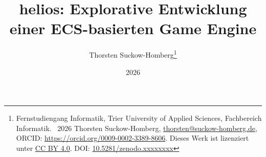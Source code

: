 \documentclass[a4paper,abstract=true]{scrreprt}
\theoremstyle{definition}
\begin{document}
    \title{helios: Explorative Entwicklung einer ECS-basierten Game Engine}

    \author{
        Thorsten Suckow-Homberg\thanks{%
          Fernstudiengang Informatik,
            Trier University of Applied Sciences, Fachbereich Informatik.
            \newline
            \textcopyright\ 2026 Thorsten Suckow-Homberg, \href{mailto:thorsten@suckow-homberg.de}{thorsten@suckow-homberg.de},
            ORCID: \url{https://orcid.org/0009-0002-3389-8606}.
            Dieses Werk ist lizenziert unter
            \href{https://creativecommons.org/licenses/by/4.0/}{CC BY 4.0}.
            \newline
            \newline
            DOI: \href{https://doi.org/10.5281/zenodo.xxxxxxxx}{10.5281/zenodo.xxxxxxxx}
        }%
    }

    \date{2026}


    \maketitle



    \tableofcontents


    

    \clearpage
    \sloppy
    \printbibliography
    \fussy
\end{document}
